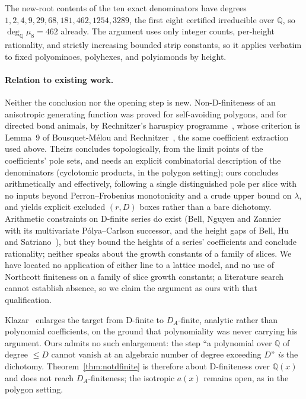 \documentclass[11pt]{article}
\begin{document}
The new-root contents of
the ten exact denominators have degrees $1,2,4,9,29,68,181,462,1254,3289$,
the first eight certified irreducible over $\mathbb Q$, so
$\deg_{\mathbb Q}\mu_8=462$ already. The argument uses only integer counts,
per-height rationality, and strictly increasing bounded strip constants, so
it applies verbatim to fixed polyominoes, polyhexes, and polyiamonds by
height.

\paragraph{Relation to existing work.}
Neither the conclusion nor the opening step is new. Non-D-finiteness of an
anisotropic generating function was proved for self-avoiding polygons, and
for directed bond animals, by Rechnitzer's haruspicy
programme~\cite{rechnitzer}, whose criterion is Lemma~9 of
Bousquet-M\'elou and Rechnitzer~\cite{bmr2002}, the same coefficient
extraction used above. Theirs
concludes topologically, from the limit points of the coefficients' pole
sets, and needs an explicit combinatorial description of the denominators
(cyclotomic products, in the polygon setting); ours concludes
arithmetically and effectively, following a single distinguished pole per
slice with no inputs beyond Perron--Frobenius monotonicity and a crude
upper bound on $\lambda$, and yields explicit excluded $(r,D)$ boxes rather
than a bare dichotomy. Arithmetic constraints on D-finite series do exist
(Bell, Nguyen and Zannier~\cite{bnz2020} with its multivariate
P\'olya--Carlson successor, and the height gaps of Bell, Hu and
Satriano~\cite{bhs2020}), but they bound the heights of a series'
coefficients and conclude rationality;
neither speaks about the growth constants of a family of slices. We have
located no application of either line to a lattice model, and no use of
Northcott finiteness on a family of slice growth constants; a literature
search cannot establish absence, so we claim the argument as ours with
that qualification.

Klazar~\cite{klazar} enlarges the target
from D-finite to $D_A$-finite, analytic rather than polynomial
coefficients, on the ground that polynomiality was never carrying his
argument. Ours admits no such enlargement: the step ``a polynomial over
$\mathbb Q$ of degree $\le D$ cannot vanish at an algebraic number of degree
exceeding $D$'' \emph{is} the dichotomy. Theorem~\ref{thm:notdfinite} is
therefore about D-finiteness over $\mathbb Q(x)$ and does not reach
$D_A$-finiteness; the isotropic $a(x)$ remains open, as in the polygon
setting.
\end{document}

